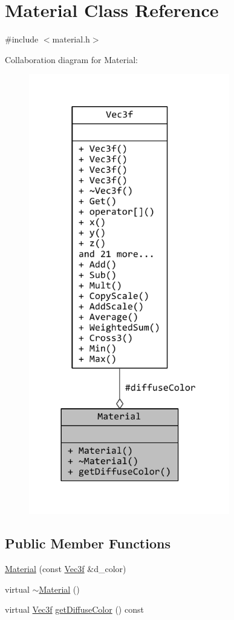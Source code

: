 \hypertarget{classMaterial}{\section{Material Class Reference}
\label{classMaterial}
}


{\ttfamily \#include $<$material.\+h$>$}



Collaboration diagram for Material\+:
\nopagebreak
\begin{figure}[H]
\begin{center}
\leavevmode
\includegraphics[width=248pt]{classMaterial__coll__graph}
\end{center}
\end{figure}
\subsection*{Public Member Functions}
\begin{DoxyCompactItemize}
\item 
\hyperlink{classMaterial_a35eb3afb51f8d1425df2da47e8030fad}{Material} (const \hyperlink{classVec3f}{Vec3f} \&d\+\_\+color)
\item 
virtual \hyperlink{classMaterial_a179e16d6a1bd4a0f039b8e4cbf2ade30}{$\sim$\+Material} ()
\item 
virtual \hyperlink{classVec3f}{Vec3f} \hyperlink{classMaterial_a83b7c9dcae7d529879d90c920892e611}{get\+Diffuse\+Color} () const 
\end{DoxyCompactItemize}
